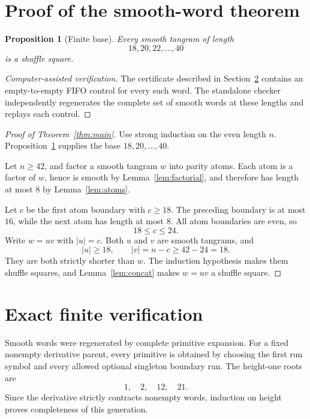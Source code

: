 \documentclass[11pt]{article}
\newtheorem{proposition}[theorem]{Proposition}
\theoremstyle{definition}
\theoremstyle{remark}
\begin{document}
\section{Proof of the smooth-word theorem}

\begin{proposition}[Finite base]\label{prop:base}
Every smooth tangram of length
\[
 18,20,22,\ldots,40
\]
is a shuffle square.
\end{proposition}

\begin{proof}[Computer-assisted verification]
The certificate described in Section~\ref{sec:verification} contains an
empty-to-empty FIFO control for every such word.  The standalone checker
independently regenerates the complete set of smooth words at these
lengths and replays each control.
\end{proof}

\begin{proof}[Proof of Theorem~\ref{thm:main}]
Use strong induction on the even length $n$.  Proposition~\ref{prop:base}
supplies the base $18,20,\ldots,40$.

Let $n\ge42$, and factor a smooth tangram $w$ into parity atoms.  Each
atom is a factor of $w$, hence is smooth by
Lemma~\ref{lem:factorial}, and therefore has length at most $8$ by
Lemma~\ref{lem:atoms}.

Let $c$ be the first atom boundary with $c\ge18$.  The preceding
boundary is at most $16$, while the next atom has length at most $8$.
All atom boundaries are even, so
\[
 18\le c\le24.
\]
Write $w=uv$ with $|u|=c$.  Both $u$ and $v$ are smooth tangrams, and
\[
 |u|\ge18,\qquad |v|=n-c\ge42-24=18.
\]
They are both strictly shorter than $w$.  The induction hypothesis
makes them shuffle squares, and Lemma~\ref{lem:concat} makes $w=uv$ a
shuffle square.
\end{proof}

\section{Exact finite verification}\label{sec:verification}

Smooth words were regenerated by complete primitive expansion.  For a
fixed nonempty derivative parent, every primitive is obtained by
choosing the first run symbol and every allowed optional singleton
boundary run.  The height-one roots are
\[
 1,\quad2,\quad12,\quad21.
\]
Since the derivative strictly contracts nonempty words, induction on
height proves completeness of this generation.
\end{document}
